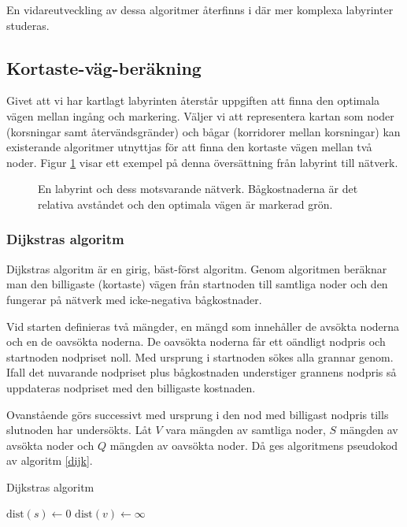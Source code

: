 \documentclass[11pt]{article}
\begin{document}
\begin{flushleft}
En vidareutveckling av dessa algoritmer återfinns i \cite{flood} där mer komplexa labyrinter studeras.

\subsection{Kortaste-väg-beräkning}
\label{optimalvag}
Givet att vi har kartlagt labyrinten återstår uppgiften att finna den optimala vägen mellan ingång och markering. Väljer vi att representera kartan som noder (korsningar samt återvändsgränder) och bågar (korridorer mellan korsningar) kan existerande algoritmer utnyttjas för att finna den kortaste vägen mellan två noder. Figur \ref{labToGraph} visar ett exempel på denna översättning från labyrint till nätverk. 

\begin{figure}[htbp]
\centering
\noindent\resizebox{.6\linewidth}{!}{
	}
	\caption{En labyrint och dess motsvarande nätverk. Bågkostnaderna är det relativa avståndet och den optimala vägen är markerad grön.\label{labToGraph}}	
\end{figure}

\subsubsection{Dijkstras algoritm}
Dijkstras algoritm är en girig, bäst-först algoritm. Genom algoritmen beräknar man den billigaste (kortaste) vägen från startnoden till samtliga noder och den fungerar på nätverk med icke-negativa bågkostnader. 

Vid starten definieras två mängder, en mängd som innehåller de avsökta noderna och en de oavsökta noderna. De oavsökta noderna får ett oändligt nodpris och startnoden nodpriset noll. Med ursprung i startnoden sökes alla grannar genom. Ifall det nuvarande nodpriset plus bågkostnaden understiger grannens nodpris så uppdateras nodpriset med den billigaste kostnaden.

Ovanstående görs successivt med ursprung i den nod med billigast nodpris tills slutnoden har undersökts. Låt $V$ vara mängden av samtliga noder, $S$ mängden av avsökta noder och $Q$ mängden av oavsökta noder. Då ges algoritmens pseudokod av algoritm \ref{dijk}.

\begin{algorithm}
	\caption{Dijkstras algoritm} \label{dijk}
	\begin{algorithmic}[1]
			\State $\textrm{dist}(s) \gets 0$
				\State $\textrm{dist}(v) \gets \infty$
			\EndFor
			

\end{algorithmic}
\end{algorithm}
\end{flushleft}
\end{document}

